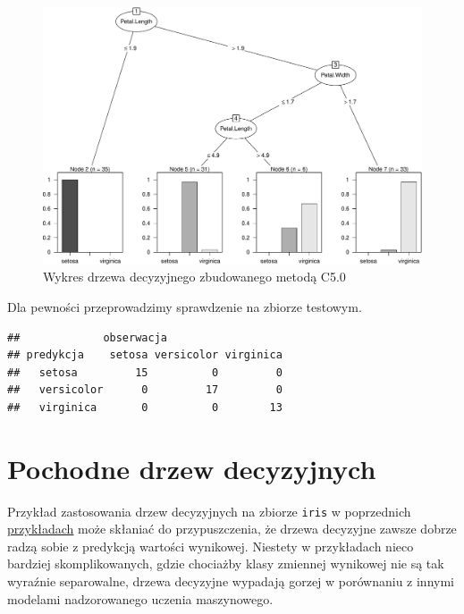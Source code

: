 \documentclass[
]{book}
\newenvironment{Shaded}{\begin{snugshade}}{\end{snugshade}}
\newcommand{\DataTypeTok}[1]{\textcolor[rgb]{0.13,0.29,0.53}{#1}}
\newcommand{\KeywordTok}[1]{\textcolor[rgb]{0.13,0.29,0.53}{\textbf{#1}}}
\newcommand{\NormalTok}[1]{#1}
\newcommand{\OperatorTok}[1]{\textcolor[rgb]{0.81,0.36,0.00}{\textbf{#1}}}
\newcommand{\StringTok}[1]{\textcolor[rgb]{0.31,0.60,0.02}{#1}}
\theoremstyle{plain}
\theoremstyle{definition}
\theoremstyle{definition}
\theoremstyle{definition}
\theoremstyle{definition}
\theoremstyle{remark}
\begin{document}
\begin{figure}
\centering
\includegraphics{EksploracjaDanych_files/figure-latex/C50-1.pdf}
\caption{\label{fig:C50}Wykres drzewa decyzyjnego zbudowanego metodą C5.0}
\end{figure}

Dla pewności przeprowadzimy sprawdzenie na zbiorze testowym.

\begin{Shaded}
\end{Shaded}

\begin{verbatim}
##             obserwacja
## predykcja    setosa versicolor virginica
##   setosa         15          0         0
##   versicolor      0         17         0
##   virginica       0          0        13
\end{verbatim}

\hypertarget{pochodne-drzew-decyzyjnych}{%
\chapter{Pochodne drzew decyzyjnych}\label{pochodne-drzew-decyzyjnych}}

Przykład zastosowania drzew decyzyjnych na zbiorze \texttt{iris} w poprzednich \protect\hyperlink{przyk41}{przykładach} może skłaniać do przypuszczenia, że drzewa decyzyjne zawsze dobrze radzą sobie z predykcją wartości wynikowej. Niestety w przykładach nieco bardziej skomplikowanych, gdzie chociażby klasy zmiennej wynikowej nie są tak wyraźnie separowalne, drzewa decyzyjne wypadają gorzej w porównaniu z innymi modelami nadzorowanego uczenia maszynowego.
\end{document}
